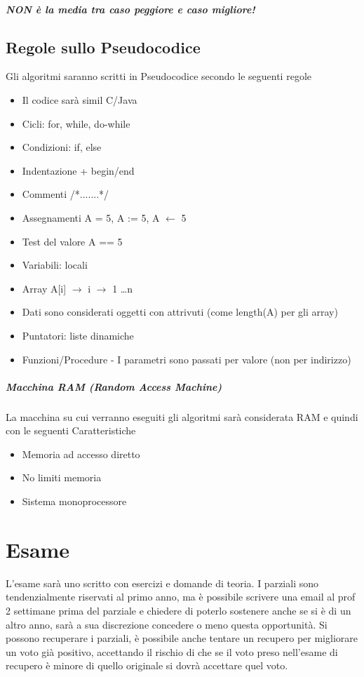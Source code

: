 \documentclass[12pt, a4paper, openany]{book}
\begin{document}
\paragraph{NON è la media tra caso peggiore e caso migliore!}

\section{Regole sullo Pseudocodice}
Gli algoritmi saranno scritti in Pseudocodice secondo le seguenti regole
\begin{itemize}
    \item Il codice sarà simil C/Java
    \item Cicli: for, while, do-while
    \item Condizioni: if, else
    \item Indentazione + begin/end
    \item Commenti /*.......*/
    \item Assegnamenti A = 5, A := 5, A $\leftarrow$ 5
    \item Test del valore A == 5
    \item Variabili: locali
    \item Array A[i] $\rightarrow$ i $\rightarrow$ 1 \dots n
    \item Dati sono considerati oggetti con attrivuti (come length(A) per gli array)
    \item Puntatori: liste dinamiche
    \item Funzioni/Procedure - I parametri sono passati per valore (non per indirizzo)
\end{itemize}

\paragraph{Macchina RAM (Random Access Machine)}
La macchina su cui verranno eseguiti gli algoritmi sarà considerata RAM e quindi con le seguenti Caratteristiche
\begin{itemize}
    \item Memoria ad accesso diretto
    \item No limiti memoria
    \item Sistema monoprocessore
\end{itemize}


\chapter{Esame}
L'esame sarà uno scritto con esercizi e domande di teoria. 
I parziali sono tendenzialmente riservati al primo anno, ma è possibile scrivere una email al prof 2 settimane prima del parziale e chiedere di poterlo sostenere
anche se si è di un altro anno, sarà a sua discrezione concedere o meno questa opportunità.
Si possono recuperare i parziali, è possibile anche tentare un recupero per migliorare un voto già positivo, accettando il rischio di
che se il voto preso nell'esame di recupero è minore di quello originale si dovrà accettare quel voto.
\end{document}
